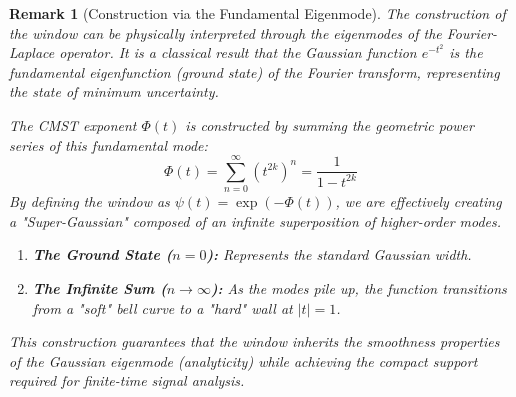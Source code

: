 \documentclass[11pt]{article}
\theoremstyle{breakdef}
\newtheorem{remark}[theorem]{Remark}
\begin{document}
\begin{remark}[Construction via the Fundamental Eigenmode]
The construction of the window can be physically interpreted through the eigenmodes of the Fourier-Laplace operator. 
It is a classical result that the Gaussian function $e^{-t^2}$ is the fundamental eigenfunction (ground state) of the Fourier transform, representing the state of minimum uncertainty.

The CMST exponent $\Phi(t)$ is constructed by summing the geometric power series of this fundamental mode:
\begin{equation}
    \Phi(t) = \sum_{n=0}^{\infty} (t^{2k})^n = \frac{1}{1 - t^{2k}}
\end{equation}
By defining the window as $\psi(t) = \exp(-\Phi(t))$, we are effectively creating a "Super-Gaussian" composed of an infinite superposition of higher-order modes.
\begin{enumerate}
    \item \textbf{The Ground State ($n=0$):} Represents the standard Gaussian width.
    \item \textbf{The Infinite Sum ($n \to \infty$):} As the modes pile up, the function transitions from a "soft" bell curve to a "hard" wall at $|t|=1$.
\end{enumerate}
This construction guarantees that the window inherits the smoothness properties of the Gaussian eigenmode (analyticity) while achieving the compact support required for finite-time signal analysis.
\end{remark}
\end{document}
